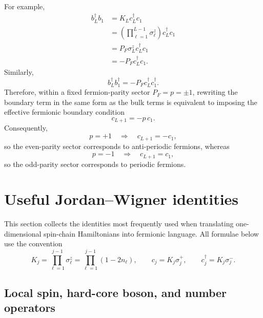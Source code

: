 For example,
\begin{align}
    b_L^\dagger b_1
    &=
    K_Lc_L^\dagger c_1
    \nonumber\\
    &=
    \left(\prod_{\ell=1}^{L-1}\sigma_\ell^z\right)c_L^\dagger c_1
    \nonumber\\
    &=
    P_F\sigma_L^z c_L^\dagger c_1
    \nonumber\\
    &=
    -P_F c_L^\dagger c_1.
\end{align}
Similarly,
\begin{equation}
    b_L^\dagger b_1^\dagger
    =
    -P_F c_L^\dagger c_1^\dagger.
\end{equation}
Therefore, within a fixed fermion-parity sector \(P_F=p=\pm1\), rewriting the boundary
term in the same form as the bulk terms is equivalent to imposing the effective
fermionic boundary condition
\begin{equation}
\label{eq:effective-jw-boundary-condition}
    c_{L+1}=-p\,c_1.
\end{equation}
Consequently,
\begin{equation}
    p=+1
    \quad\Longrightarrow\quad
    c_{L+1}=-c_1,
\end{equation}
so the even-parity sector corresponds to anti-periodic fermions, whereas
\begin{equation}
    p=-1
    \quad\Longrightarrow\quad
    c_{L+1}=c_1,
\end{equation}
so the odd-parity sector corresponds to periodic fermions.

\section{Useful Jordan--Wigner identities}

This section collects the identities most frequently used when translating
one-dimensional spin-chain Hamiltonians into fermionic language. All formulae below
use the convention
\begin{equation}
    K_j=\prod_{\ell=1}^{j-1}\sigma_\ell^z
    =
    \prod_{\ell=1}^{j-1}(1-2n_\ell),
    \qquad
    c_j=K_j\sigma_j^+,
    \qquad
    c_j^\dagger=K_j\sigma_j^-.
\end{equation}

\subsection*{Local spin, hard-core boson, and number operators}

